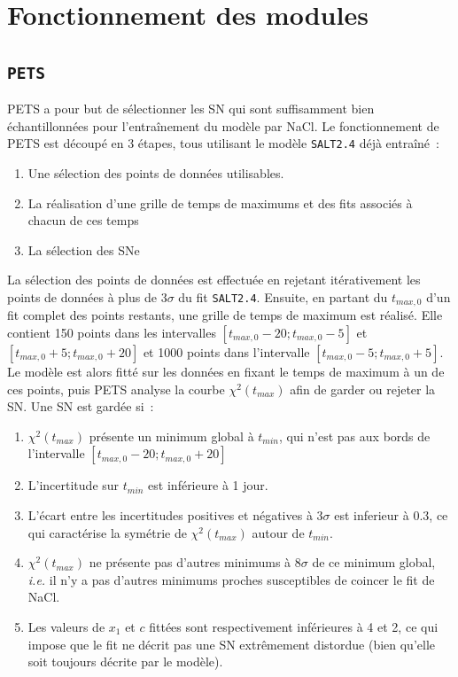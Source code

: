 \documentclass{book}
\def\pets{\texttt{PETS}\xspace}
\def\saltd{\texttt{SALT2.4}\xspace}
\begin{document}
\section{Fonctionnement des modules}

\subsection{\pets}
\label{anx:pets}

PETS a pour but de sélectionner les SN qui sont suffisamment bien échantillonnées pour l'entraînement du modèle par NaCl.
Le fonctionnement de PETS est découpé en 3 étapes, tous utilisant le modèle \saltd déjà entraîné~:
\begin{enumerate}
\item Une sélection des points de données utilisables.
\item La réalisation d'une grille de temps de maximums et des fits associés à chacun de ces temps
\item La sélection des SNe
\end{enumerate}

La sélection des points de données est effectuée en rejetant itérativement les points de données à plus de 3$\sigma$ du fit \saltd. Ensuite, en partant du $t_{max, 0}$ d'un fit complet des points restants, une grille de temps de maximum est réalisé. Elle contient 150 points dans les intervalles $[t_{max, 0} - 20 ; t_{max, 0} - 5]$ et $[t_{max, 0} +5; t_{max, 0} + 20]$ et 1000 points dans l'intervalle $[t_{max, 0} - 5 ; t_{max, 0} + 5]$. Le modèle est alors fitté sur les données en fixant le temps de maximum à un de ces points, puis PETS analyse la courbe $\chi^2(t_{max})$ afin de garder ou rejeter la SN. Une SN est gardée si~:
\begin{enumerate}
\item $\chi^2(t_{max})$ présente un minimum global à $t_{min}$, qui n'est pas aux bords de l'intervalle $[t_{max,0} - 20 ; t_{max, 0} + 20]$
\item L'incertitude sur $t_{min}$ est inférieure à 1 jour.
\item L'écart entre les incertitudes positives et négatives à 3$\sigma$ est inferieur à $0.3$, ce qui caractérise la symétrie de $\chi^2(t_{max})$ autour de $t_{min}$.
\item $\chi^2(t_{max})$ ne présente pas d'autres minimums à 8$\sigma$ de ce minimum global, \textit{i.e.} il n'y a pas d'autres minimums proches susceptibles de coincer le fit de NaCl.
\item Les valeurs de $x_1$ et $c$ fittées sont respectivement inférieures à 4 et 2, ce qui impose que le fit ne décrit pas une SN extrêmement distordue (bien qu'elle soit toujours décrite par le modèle).
\end{enumerate}
\end{document}
